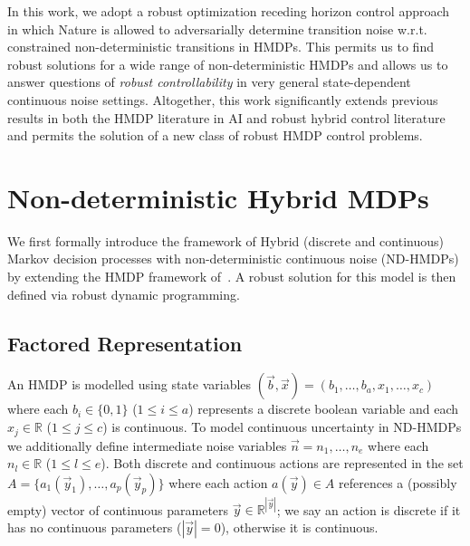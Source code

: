 \documentclass[letterpaper]{article}
\begin{document}
In this work, we adopt a robust optimization receding horizon control
approach in which Nature is allowed to adversarially determine
transition noise w.r.t. constrained non-deterministic transitions in HMDPs.
This permits us to find robust solutions for a wide range of
non-deterministic HMDPs and allows us to answer questions of \emph{robust
controllability} in very general state-dependent continuous noise settings.
Altogether, this work significantly extends previous results in both
the HMDP literature in AI and robust hybrid control literature
and permits the solution of a new class of robust HMDP control problems.


\section{Non-deterministic Hybrid MDPs} 

We first formally introduce the framework of Hybrid (discrete and
continuous) Markov decision processes with non-deterministic
continuous noise (ND-HMDPs) by extending the HMDP framework 
of~\cite{sdp_aaai}. A robust solution for this model is then defined
via robust dynamic programming.

\subsection{Factored Representation}

An HMDP is modelled using state variables $(\vec{b},\vec{x}) = (
b_1,\ldots,b_a,x_{1},\ldots,x_c )$ where each $b_i \in \{ 0,1 \}$
($1 \leq i \leq a$) represents a discrete boolean variable and
each $x_j \in \mathbb{R}$ ($1 \leq j \leq c$) is continuous.  To model
continuous uncertainty in ND-HMDPs we additionally define intermediate
noise variables $\vec{n} = n_1, \ldots , n_e$ where each
$n_l \in \mathbb{R}$ ($1 \leq l \leq e$).  Both discrete and
continuous actions are represented in the set $A
= \{a_1(\vec{y}_1), \ldots, a_p(\vec{y}_p) \}$ where each action
$a(\vec{y}) \in A$ references a (possibly empty) vector of continuous
parameters $\vec{y} \in \mathbb{R}^{|\vec{y}|}$; we say an action is
discrete if it has no continuous parameters ($|\vec{y}| = 0$), otherwise
it is continuous.
\end{document}

